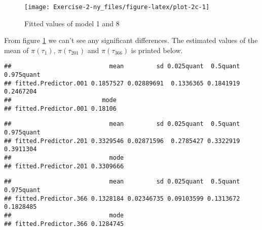 \documentclass[
]{article}
\newenvironment{Shaded}{\begin{snugshade}}{\end{snugshade}}
\newcommand{\DecValTok}[1]{\textcolor[rgb]{0.00,0.00,0.81}{#1}}
\newcommand{\NormalTok}[1]{#1}
\newcommand{\SpecialCharTok}[1]{\textcolor[rgb]{0.00,0.00,0.00}{#1}}
\begin{document}
\begin{figure}

{\centering \texttt{[image: Exercise-2-ny\_files/figure-latex/plot-2c-1]} 

}

\caption{Fitted values of model 1 and 8}\label{fig:plot-2c}
\end{figure}

From figure \ref{fig:plot-2c} we can't see any significant differences. The estimated values of the mean of \(\pi(\tau_1)\), \(\pi(\tau_{201})\) and \(\pi (\tau_{366})\) is printed below.

\begin{Shaded}
\end{Shaded}

\begin{verbatim}
##                           mean         sd 0.025quant  0.5quant 0.975quant
## fitted.Predictor.001 0.1857527 0.02889691  0.1336365 0.1841919  0.2467204
##                         mode
## fitted.Predictor.001 0.18106
\end{verbatim}

\begin{Shaded}
\end{Shaded}

\begin{verbatim}
##                           mean         sd 0.025quant  0.5quant 0.975quant
## fitted.Predictor.201 0.3329546 0.02871596  0.2785427 0.3322919  0.3911304
##                           mode
## fitted.Predictor.201 0.3309666
\end{verbatim}

\begin{Shaded}
\end{Shaded}

\begin{verbatim}
##                           mean         sd 0.025quant  0.5quant 0.975quant
## fitted.Predictor.366 0.1328184 0.02346735 0.09103599 0.1313672  0.1828485
##                           mode
## fitted.Predictor.366 0.1284745
\end{verbatim}
\end{document}
